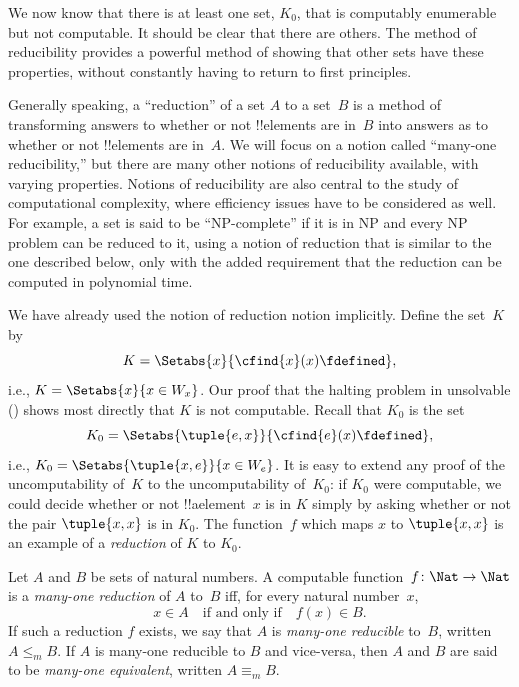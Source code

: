 \documentclass[../../../include/open-logic-section]{subfiles}
\begin{document}

\begin{explain}
We now know that there is at least one set, $K_0$, that is computably
enumerable but not computable. It should be clear that there are
others. The method of reducibility provides a powerful method of
showing that other sets have these properties, without constantly
having to return to first principles.

Generally speaking, a ``reduction'' of a set $A$ to a set~$B$ is a
method of transforming answers to whether or not !!{element}s are in~$B$
into answers as to whether or not !!{element}s are in~$A$. We will focus
on a notion called ``many-one reducibility,'' but there are many other
notions of reducibility available, with varying properties. Notions of
reducibility are also central to the study of computational
complexity, where efficiency issues have to be considered as well. For
example, a set is said to be ``NP-complete'' if it is in NP and every
NP problem can be reduced to it, using a notion of reduction that is
similar to the one described below, only with the added requirement
that the reduction can be computed in polynomial time.

We have already used the notion of reduction notion implicitly. Define
the set~$K$ by
\[
K = \Setabs{x}{\cfind{x}(x) \fdefined},
\]
i.e., $K = \Setabs{x}{x \in W_x}$. Our proof that the halting problem
in unsolvable () shows most directly
that $K$ is not computable. Recall that $K_0$ is the set
\[
K_0 = \Setabs{\tuple{e, x}}{\cfind{e}(x) \fdefined },
\]
i.e., $K_0 = \Setabs{\tuple{x,e}}{x \in W_e}$. It is easy to extend
any proof of the uncomputability of~$K$ to the uncomputability
of~$K_0$: if $K_0$ were computable, we could decide whether or not
!!a{element}~$x$ is in $K$ simply by asking whether or not the pair
$\tuple{x, x}$ is in $K_0$. The function~$f$ which maps $x$ to
$\tuple{x, x}$ is an example of a \emph{reduction} of $K$ to $K_0$.
\end{explain}

\begin{defn}
Let $A$ and $B$ be sets of natural numbers. A computable
function~$f\colon \Nat \to \Nat$ is a \emph{many-one reduction} of $A$
to~$B$ iff, for every natural number~$x$,
\[
x \in A \quad \text{if and only if} \quad f(x) \in B.
\]
If such a reduction $f$ exists, we say that $A$ is \emph{many-one
reducible} to~$B$, written $A \leq_m B$. If $A$ is many-one reducible
to $B$ and vice-versa, then $A$ and $B$ are said to be \emph{many-one
equivalent}, written $A \equiv_m B$.
\end{defn}
\end{document}
